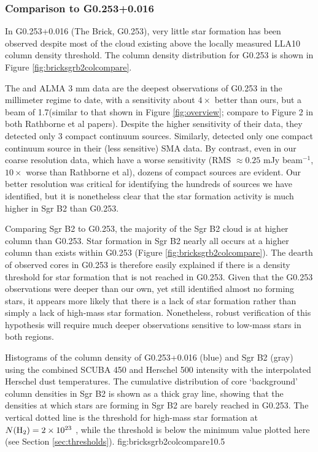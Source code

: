\documentclass[twocolumn]{aastex61}
\begin{document}
\subsubsection{Comparison to G0.253+0.016}
In G0.253+0.016 (The Brick, G0.253), very little star formation
has been observed
\citep{Longmore2013a,Johnston2014a,Rathborne2014a,Rathborne2015a} despite most
of the cloud existing above the locally measured LLA10 column
density threshold.  The column density distribution for G0.253
is shown in Figure \ref{fig:bricksgrb2colcompare}.

The \citet{Rathborne2014a} and \citet{Rathborne2015a} ALMA 3 mm data are the
deepest observations of G0.253 in the millimeter regime to date, with a
sensitivity about $4\times$ better than ours, but a beam of 1.7\arcsec (similar
to that shown in Figure \ref{fig:overview}; compare to Figure 2 in both
Rathborne et al papers).  Despite the higher sensitivity of their data,
they detected only 3 compact continuum sources.  Similarly,
\citet{Kauffmann2013a} detected only one compact continuum source in their
(less sensitive) SMA data.  By contrast, even in our coarse resolution data, which
have a worse sensitivity (RMS $\approx 0.25$ mJy beam$^{-1}$, $10\times$ worse
than Rathborne et al), dozens of compact sources are evident.  Our better
resolution was critical for identifying the hundreds of sources we have
identified, but it is nonetheless clear that the star formation activity is
much higher in Sgr B2 than G0.253.


Comparing Sgr B2 to G0.253, the majority of the Sgr B2 cloud is at higher
column than G0.253.  Star formation in Sgr B2 nearly all occurs
at a higher column than exists within G0.253 (Figure
\ref{fig:bricksgrb2colcompare}).  The dearth of observed cores in G0.253 is
therefore easily explained if there is a density threshold for star
formation that is not reached in G0.253.  Given that the G0.253 observations
were deeper than our own, yet still identified almost no forming stars, it
appears more likely that there is a lack of star formation rather than simply a
lack of high-mass star formation.  Nonetheless, robust verification of this
hypothesis will require much deeper observations sensitive to low-mass stars
in both regions.

{Histograms of the column density of G0.253+0.016 (blue) and Sgr B2 (gray)
using the combined SCUBA 450 \um and Herschel 500 \um intensity with the
interpolated Herschel dust temperatures.  The cumulative distribution of core
`background' column densities in Sgr B2 is shown as a thick gray line, showing
that the densities at which stars are forming in Sgr B2 are barely
reached in G0.253.  The vertical dotted line is the \citet{Krumholz2008a}
threshold for high-mass star formation at $N(\textrm{H}_{2})=2\times10^{23}$ \persc, while
the \citet{Lada2010a} threshold is below the minimum value plotted here (see
Section \ref{sec:thresholds}).}
{fig:bricksgrb2colcompare}{1}{0.5\textwidth}
\end{document}

